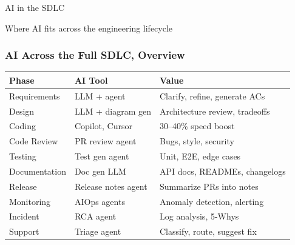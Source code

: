 \begin{frame}[fragile]\frametitle{}
\begin{center}
{\Large AI in the SDLC}

{\small Where AI fits across the engineering lifecycle}
\end{center}
\end{frame}

\begin{frame}[fragile]\frametitle{AI Across the Full SDLC, Overview}
\begin{center}
\begin{tabular}{|p{1.2cm}|p{2cm}|p{3cm}|}
\hline
\textbf{Phase} & \textbf{AI Tool} & \textbf{Value} \\
\hline
Requirements & LLM + agent & Clarify, refine, generate ACs \\
Design & LLM + diagram gen & Architecture review, tradeoffs \\
Coding & Copilot, Cursor & 30--40\% speed boost \\
Code Review & PR review agent & Bugs, style, security \\
Testing & Test gen agent & Unit, E2E, edge cases \\
Documentation & Doc gen LLM & API docs, READMEs, changelogs \\
Release & Release notes agent & Summarize PRs into notes \\
Monitoring & AIOps agents & Anomaly detection, alerting \\
Incident & RCA agent & Log analysis, 5-Whys \\
Support & Triage agent & Classify, route, suggest fix \\
\hline
\end{tabular}
\end{center}
\end{frame}

